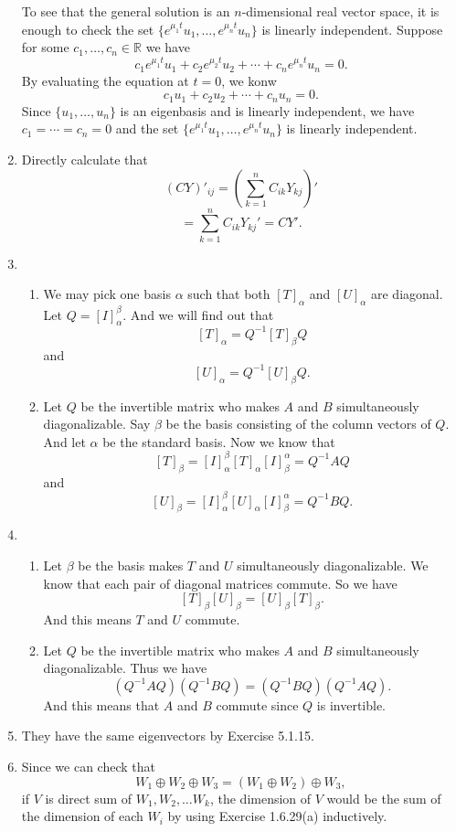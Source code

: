\begin{enumerate}
To see that the general solution is an $n$-dimensional real vector space, it is enough to check the set $\{e^{\mu_1t}u_1, \ldots, e^{\mu_nt}u_n\}$ is linearly independent.  Suppose for some $c_1, \ldots, c_n\in\mathbb{R}$ we have 
\[
    c_1e^{\mu_1t}u_1 + c_2e^{\mu_2t}u_2 + \cdots + c_ne^{\mu_nt}u_n = 0.
\]
By evaluating the equation at $t = 0$, we konw  
\[
    c_1u_1 + c_2u_2 + \cdots + c_nu_n = 0.
\]
Since $\{u_1, \ldots, u_n\}$ is an eigenbasis and is linearly independent, we have $c_1 = \cdots = c_n = 0$ and the set $\{e^{\mu_1t}u_1, \ldots, e^{\mu_nt}u_n\}$ is linearly independent.
\item Directly calculate that 
\[(CY)'_{ij}=(\sum_{k=1}^n{C_{ik}Y_{kj}})'\]
\[=\sum_{k=1}^n{C_{ik}Y_{kj}'}=CY'.\]
\item \begin{enumerate}
\item We may pick one basis $\alpha $ such that both $[T]_{\alpha}$ and $[U]_{\alpha}$ are diagonal. Let $Q=[I]_{\alpha}^{\beta}$. And we will find out that 
\[[T]_{\alpha}=Q^{-1}[T]_{\beta}Q\]
and 
\[[U]_{\alpha}=Q^{-1}[U]_{\beta}Q.\]
\item Let $Q$ be the invertible matrix who makes $A$ and $B$ simultaneously diagonalizable. Say $\beta $ be the basis consisting of the column vectors of $Q$. And let $\alpha $ be the standard basis. Now we know that 
\[[T]_{\beta}=[I]_{\alpha}^{\beta}[T]_{\alpha}[I]_{\beta}^{\alpha}=Q^{-1}AQ\]
and 
\[[U]_{\beta}=[I]_{\alpha}^{\beta}[U]_{\alpha}[I]_{\beta}^{\alpha}=Q^{-1}BQ.\]
\end{enumerate}
\item \begin{enumerate}
\item Let $\beta $ be the basis makes $T$ and $U$ simultaneously diagonalizable. We know that each pair of diagonal matrices commute. So we have 
\[[T]_{\beta}[U]_{\beta}=[U]_{\beta}[T]_{\beta}.\]
And this means $T$ and $U$ commute.
\item Let $Q$ be the invertible matrix who makes $A$ and $B$ simultaneously diagonalizable. Thus we have 
\[(Q^{-1}AQ)(Q^{-1}BQ)=(Q^{-1}BQ)(Q^{-1}AQ).\]
And this means that $A$ and $B$ commute since $Q$ is invertible.
\end{enumerate}
\item They have the same eigenvectors by Exercise 5.1.15.
\item Since we can check that
\[W_1\oplus W_2 \oplus W_3=(W_1\oplus W_2)\oplus W_3,\]
if $V$ is direct sum of $W_1,W_2,\ldots W_k$, the dimension of $V$ would be the sum of the dimension of each $W_i$ by using Exercise 1.6.29(a) inductively. 


\end{enumerate}
